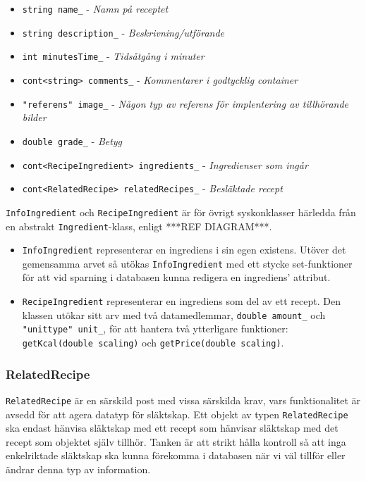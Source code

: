 \begin{itemize}
\item \verb+string name_+ - \emph{Namn på receptet}
\item \verb+string description_+ - \emph{Beskrivning/utförande}
\item \verb+int minutesTime_+ - \emph{Tidsåtgång i minuter}
\item \verb+cont<string> comments_+ - \emph{Kommentarer i godtycklig container}
\item \verb+"referens" image_+ - \emph{Någon typ av referens för implentering av tillhörande bilder}
\item \verb+double grade_+ - \emph{Betyg}
\end{itemize}

\begin{itemize}
\item \verb+cont<RecipeIngredient> ingredients_+ - \emph{Ingredienser som ingår}
\item \verb+cont<RelatedRecipe> relatedRecipes_+ - \emph{Besläktade recept}
\end{itemize}
%
\verb+InfoIngredient+ och \verb+RecipeIngredient+ är för övrigt syskonklasser härledda från en abstrakt \verb+Ingredient+-klass, enligt ***REF DIAGRAM***.

\begin{itemize}
\item \verb+InfoIngredient+ representerar en ingrediens i sin egen existens. Utöver det gemensamma arvet så utökas \verb+InfoIngredient+ med ett stycke set-funktioner för att vid sparning i databasen kunna redigera en ingrediens' attribut. 
\item \verb+RecipeIngredient+ representerar en ingrediens som del av ett recept. Den klassen utökar sitt arv med två datamedlemmar, \verb+double amount_+ och \verb+"unittype" unit_+, för att hantera två ytterligare funktioner: \verb+getKcal(double scaling)+ och \verb+getPrice(double scaling)+.
\end{itemize}
 
\subsubsection{RelatedRecipe}
\verb+RelatedRecipe+ är en särskild post med vissa särskilda krav, vars funktionalitet är avsedd för att agera datatyp för släktskap. Ett objekt av typen \verb+RelatedRecipe+ ska endast hänvisa släktskap med ett recept som hänvisar släktskap med det recept som objektet själv tillhör. Tanken är att strikt hålla kontroll så att inga enkelriktade släktskap ska kunna förekomma i databasen när vi väl tillför eller ändrar denna typ av information.

